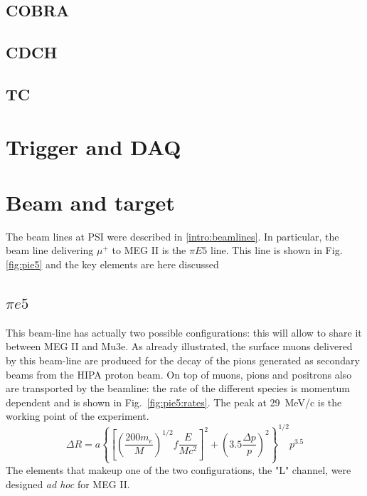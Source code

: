 \begin{refsection}
    \subsection{COBRA}
    \label{MEG:COBRA}
    \subsection{CDCH}
    \subsection{TC}

\section{Trigger and DAQ}

\section{Beam and target}
    The beam lines at PSI were described in \ref{intro:beamlines}. 
    In particular, the beam line delivering $\mu^+$ to MEG II is the $\pi E5$ line. 
    This line is shown in  Fig. \ref{fig:pie5} and the key elements are here discussed

    \subsection{$\pi e5$}
        This beam-line has actually two possible configurations: this will allow to share it between MEG II and Mu3e. 
        As already illustrated, the surface muons delivered by this beam-line are produced for the decay of the pions generated as secondary beams from the HIPA proton beam.
        On top of muons, pions and positrons also are transported by the beamline: the rate of the different species is momentum dependent and is shown in Fig.~\ref{fig:pie5:rates}.
        The peak at \SI{29}{MeV/c} is the working point of the experiment.
        \begin{equation}
            \Delta R = a \left\{
                \left[  
                    \left( \frac{200 m_e}{M}\right)^{1/2} f \frac{E}{Mc^2}
                \right]^2 + 
                \left( 3.5\frac{\Delta p }{p}\right)^2
            \right\} ^{1/2} p^{3.5}
        \end{equation}
        The elements that makeup one of the two configurations, the "L" channel, were designed \textit{ad hoc} for MEG II.


\end{refsection}
